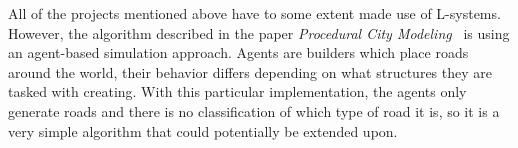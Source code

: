 All of the projects mentioned above have to some extent made use of L-systems.
However, the algorithm described in the paper \textit{Procedural City Modeling}~\cite{citygen_lechner} is using an agent-based simulation approach.
Agents are builders which place roads around the world, their behavior differs depending on what structures they are tasked with creating.
With this particular implementation, the agents only generate roads and there is no classification of which type of road it is, so it is a very simple algorithm that could potentially be extended upon.
